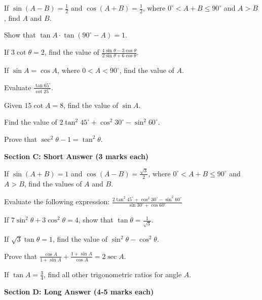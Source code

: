 \documentclass[12pt,a4paper]{exam}
\begin{document}
\begin{questions}
\question[2] If $\sin(A - B) = \frac{1}{2}$ and $\cos(A + B) = \frac{1}{2}$, where $0^\circ < A + B \le 90^\circ$ and $A > B$, find $A$ and $B$.
\vspace{0.15cm}

\question[2] Show that $\tan A \cdot \tan(90^\circ - A) = 1$.
\vspace{0.15cm}

\question[2] If $3 \cot \theta = 2$, find the value of $\frac{4 \sin \theta - 3 \cos \theta}{2 \sin \theta + 6 \cos \theta}$.
\vspace{0.15cm}

\question[2] If $\sin A = \cos A$, where $0 < A < 90^\circ$, find the value of $A$.
\vspace{0.15cm}

\question[2] Evaluate $\frac{\tan 65^\circ}{\cot 25^\circ}$.
\vspace{0.15cm}

\question[2] Given $15 \cot A = 8$, find the value of $\sin A$.
\vspace{0.15cm}

\question[2] Find the value of $2 \tan^2 45^\circ + \cos^2 30^\circ - \sin^2 60^\circ$.
\vspace{0.15cm}

\question[2] Prove that $\sec^2 \theta - 1 = \tan^2 \theta$.
\vspace{0.15cm}

\end{questions}
\bigskip
\noindent\textbf{\large Section C: Short Answer (3 marks each)}

\begin{questions}
\question[3] If $\sin(A + B) = 1$ and $\cos(A - B) = \frac{\sqrt{3}}{2}$, where $0^\circ < A + B \le 90^\circ$ and $A > B$, find the values of $A$ and $B$.
\vspace{0.15cm}

\question[3] Evaluate the following expression: $\frac{2 \tan^2 45^\circ + \cos^2 30^\circ - \sin^2 60^\circ}{\sin 30^\circ + \cos 60^\circ}$
\vspace{0.15cm}

\question[3] If $7 \sin^2 \theta + 3 \cos^2 \theta = 4$, show that $\tan \theta = \frac{1}{\sqrt{3}}$.
\vspace{0.15cm}

\question[3] If $\sqrt{3} \tan \theta = 1$, find the value of $\sin^2 \theta - \cos^2 \theta$.
\vspace{0.15cm}

\question[3] Prove that $\frac{\cos A}{1 + \sin A} + \frac{1 + \sin A}{\cos A} = 2 \sec A$.
\vspace{0.15cm}

\question[3] If $\tan A = \frac{3}{4}$, find all other trigonometric ratios for angle $A$.
\vspace{0.15cm}

\end{questions}
\bigskip
\noindent\textbf{\large Section D: Long Answer (4-5 marks each)}
\end{document}
